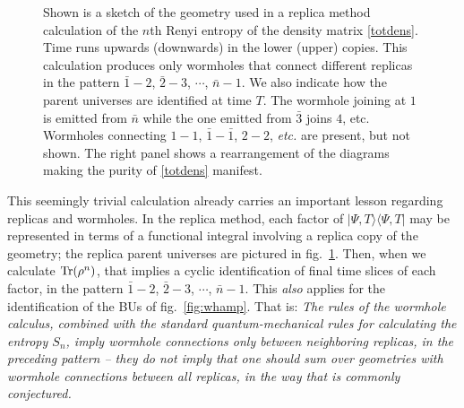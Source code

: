 \documentclass[12pt]{article}
\numberwithin{equation}{section}
\newcommand{\Tr}{{\rm Tr}}
\begin{document}
\begin{figure}[h!]
\begin{center}
 \hspace{-0.3cm} 
 \caption{\label{fig:whrep} Shown is a sketch of the geometry used in a replica method calculation of the 
 $n$th Renyi entropy of the  density matrix \eqref{totdens}. Time runs upwards (downwards) in the lower (upper) copies. This calculation produces only wormholes 
  that connect different replicas  in the pattern ${\bar 1}-2$, ${\bar 2}-3$, $\cdots$, ${\bar n} - 1$.  We also indicate how the parent universes  are identified at time $T$. The wormhole joining at $1$ is emitted from $\bar{n}$ while the one emitted from $\bar{3}$ joins $4$, etc. Wormholes connecting $1-1$, $\bar{1}-\bar{1}$, $2-2$, {\it etc.} are present, but not shown. The right panel shows a rearrangement of the diagrams making the purity of \eqref{totdens} manifest. }
\end{center}
\end{figure}

This seemingly trivial calculation already carries an important lesson regarding replicas and wormholes.  In the replica method\cite{CaWi}, each factor of $|\Psi, T\rangle \langle\Psi, T|$ may be represented in terms of a functional integral involving a replica copy of the geometry; the replica parent universes are pictured in fig.~\ref{fig:whrep}.  Then, when we calculate $\Tr (\rho^n)$, that implies a cyclic identification of final time slices of each factor, in the pattern ${\bar 1}-2$, ${\bar 2}-3$, $\cdots$, ${\bar n} - 1$. This {\it also} applies for the identification of the BUs of fig.~\ref{fig:whamp}. That is: {\it The rules of the wormhole calculus, combined with the standard quantum-mechanical rules for calculating the entropy $S_n$, imply wormhole connections only between neighboring replicas, in the preceding pattern -- they do {\rm not} imply that one should sum over geometries with wormhole connections between all replicas, in the way that is commonly conjectured\cite{Penington:2019kki, Almheiri:2019qdq}.}  
\end{document}
